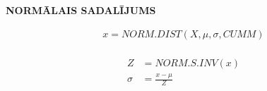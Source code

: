 
\textbf{NORMĀLAIS SADALĪJUMS}

{\begin{align*}
    x = NORM.DIST(X, \mu, \sigma, CUMM) \\
\end{align*}}


{\begin{align*}
    Z &= NORM.S.INV(x) \\
    \sigma &= \displaystyle\frac{x-\mu}{Z} 
\end{align*}}



